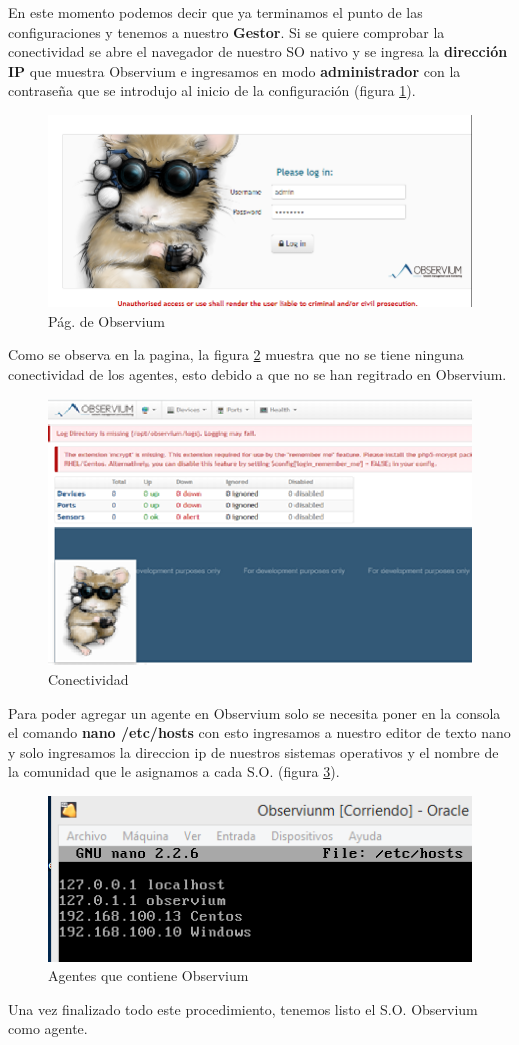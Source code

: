 En este momento podemos decir que ya terminamos el punto de las configuraciones y tenemos a nuestro \textbf{Gestor}.
Si  se quiere comprobar la  conectividad se abre el navegador de nuestro SO nativo y se ingresa la \textbf{dirección IP} que muestra Observium e ingresamos en modo \textbf{administrador} con la contraseña que se  introdujo al inicio de la configuración (figura \ref{image:observium}).

\FloatBarrier
\begin{figure}[htbp!]
		\centering
			\includegraphics[width=.5 \textwidth]{../images/3-Observium.png}
		\caption{Pág. de Observium}
		\label{image:observium}
\end{figure}
\FloatBarrier

Como se observa en la pagina, la figura \ref{image:pag} muestra que no se tiene ninguna conectividad de los agentes, esto debido a que no se han regitrado en Observium.

\FloatBarrier
\begin{figure}[htbp!]
		\centering
			\includegraphics[width=.7 \textwidth]{../images/4-Observium.png}
		\caption{Conectividad}
		\label{image:pag}
\end{figure}
\FloatBarrier

Para poder agregar un agente en Observium solo se necesita poner en la consola el comando \textbf{nano /etc/hosts} con esto ingresamos a nuestro editor de texto nano y solo ingresamos la direccion ip de nuestros sistemas operativos y el nombre de la comunidad que le asignamos a cada S.O. (figura \ref{image:agente}).

\FloatBarrier
\begin{figure}[htbp!]
		\centering
			\includegraphics[width=.5 \textwidth]{../images/5-Observium.png}
		\caption{Agentes que contiene Observium}
		\label{image:agente}
\end{figure}
\FloatBarrier

Una vez finalizado todo este procedimiento, tenemos listo el S.O. Observium como agente.
